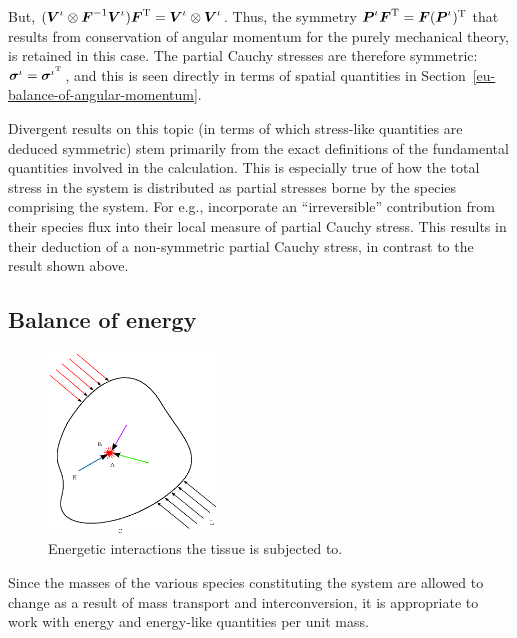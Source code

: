 \noindent But, $(\mbox{\boldmath$ V$}^\iota\otimes\mbox{\boldmath$ F$}^{-1}\mbox{\boldmath$ V$}^\iota)\mbox{\boldmath$ F$}^\mathrm{T} =
\mbox{\boldmath$ V$}^\iota\otimes\mbox{\boldmath$ V$}^\iota$. Thus, the symmetry
$\mbox{\boldmath$ P$}^\iota\mbox{\boldmath$ F$}^\mathrm{T} = \mbox{\boldmath$ F$}(\mbox{\boldmath$ P$}^\iota)^\mathrm{T}$ that results
from conservation of angular momentum for the purely mechanical
theory, is retained in this case. The partial Cauchy stresses are
therefore symmetric: $\mbox{\boldmath$\sigma$}^\iota = \mbox{\boldmath$\sigma$}^{\iota^\mathrm{T}}$, and
this is seen directly in terms of spatial quantities in
Section~\ref{eu-balance-of-angular-momentum}.

Divergent results on this topic (in terms of which stress-like
quantities are deduced symmetric) stem primarily from the exact
definitions of the fundamental quantities involved in the
calculation. This is especially true of how the total stress in the
system is distributed as partial stresses borne by the species
comprising the system. For e.g., \citet{EpsteinMaugin:2000}
incorporate an ``irreversible'' contribution from their species flux
into their local measure of partial Cauchy stress. This results in
their deduction of a non-symmetric partial Cauchy stress, in contrast
to the result shown above.

\subsection{Balance of energy}
\label{balance-of-energy}

\begin{figure}[ht]
  \centering
  \includegraphics[width=0.4\textwidth]
                  {images/elucidation/continuum-potato-energy}
  \caption{Energetic interactions the tissue is subjected to.}
  \label{continuum-potato-energy}
\end{figure}

Since the masses of the various species constituting the system are
allowed to change as a result of mass transport and
interconversion, it is appropriate to work with energy and energy-like
quantities per unit mass.

